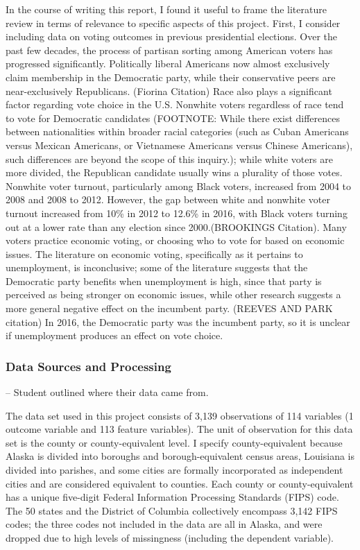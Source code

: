 \documentclass[11pt]{article}
\begin{document}
In the course of writing this report, I found it useful to frame the
literature review in terms of relevance to specific aspects of this
project. First, I consider including data on voting outcomes in previous
presidential elections. Over the past few decades, the process of
partisan sorting among American voters has progressed significantly.
Politically liberal Americans now almost exclusively claim membership in
the Democratic party, while their conservative peers are
near-exclusively Republicans. (Fiorina Citation) Race also plays a
significant factor regarding vote choice in the U.S. Nonwhite voters
regardless of race tend to vote for Democratic candidates (FOOTNOTE:
While there exist differences between nationalities within broader
racial categories (such as Cuban Americans versus Mexican Americans, or
Vietnamese Americans versus Chinese Americans), such differences are
beyond the scope of this inquiry.); while white voters are more divided,
the Republican candidate usually wins a plurality of those votes.
Nonwhite voter turnout, particularly among Black voters, increased from
2004 to 2008 and 2008 to 2012. However, the gap between white and
nonwhite voter turnout increased from 10\% in 2012 to 12.6\% in 2016,
with Black voters turning out at a lower rate than any election since
2000.(BROOKINGS Citation). Many voters practice economic voting, or
choosing who to vote for based on economic issues. The literature on
economic voting, specifically as it pertains to unemployment, is
inconclusive; some of the literature suggests that the Democratic party
benefits when unemployment is high, since that party is perceived as
being stronger on economic issues, while other research suggests a more
general negative effect on the incumbent party. (REEVES AND PARK
citation) In 2016, the Democratic party was the incumbent party, so it
is unclear if unemployment produces an effect on vote choice.

    \hypertarget{data-sources-and-processing}{%
\subsubsection{Data Sources and
Processing}\label{data-sources-and-processing}}

-- Student outlined where their data came from.

The data set used in this project consists of 3,139 observations of 114
variables (1 outcome variable and 113 feature variables). The unit of
observation for this data set is the county or county-equivalent level.
I specify county-equivalent because Alaska is divided into boroughs and
borough-equivalent census areas, Louisiana is divided into parishes, and
some cities are formally incorporated as independent cities and are
considered equivalent to counties. Each county or county-equivalent has
a unique five-digit Federal Information Processing Standards (FIPS)
code. The 50 states and the District of Columbia collectively encompass
3,142 FIPS codes; the three codes not included in the data are all in
Alaska, and were dropped due to high levels of missingness (including
the dependent variable).
\end{document}
